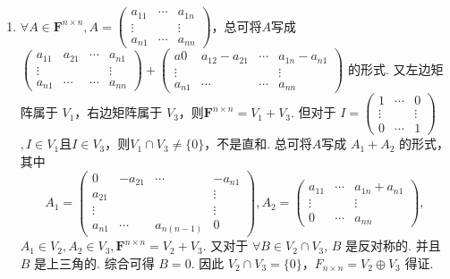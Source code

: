 \begin{enumerate}
\begin{enumerate}
              \item $\forall A\in \mathbf{F}^{n\times n},A=\begin{pmatrix}
                            a_{11} & \cdots & a_{1n} \\
                            \vdots &        & \vdots \\
                            a_{n1} & \cdots & a_{nn}
                        \end{pmatrix}$，总可将$A$写成 $\begin{pmatrix}
                            a_{11} & a_{21} & \cdots & a_{n1} \\
                            \vdots &        &        & \vdots \\
                            a_{n1} & \cdots & \cdots & a_{nn}
                        \end{pmatrix}+\begin{pmatrix}
                            a0     & a_{12}-a_{21} & \cdots & a_{1n}-a_{n1} \\
                            \vdots &               &        & \vdots        \\
                            a_{n1} & \cdots        & \cdots & a_{nn}
                        \end{pmatrix}$ 的形式. 又左边矩阵属于 $V_1$，右边矩阵属于 $V_3$，则$\mathbf{F}^{n \times n}=V_1+V_3$. 但对于 $I=\begin{pmatrix}
                            1      & \cdots & 0      \\
                            \vdots &        & \vdots \\
                            0      & \cdots & 1
                        \end{pmatrix} $ $,I \in V_1$且$I \in V_3$，则$V_1\cap V_3\ne\{0\}$，不是直和. 总可将$A$写成 $A_1+A_2$ 的形式，其中
                    \[A_1=\begin{pmatrix}
                            0      & -a_{21} & \cdots     & -a_{n1} \\
                            a_{21} &         &            & \vdots  \\
                            \vdots &         &            & \vdots  \\
                            a_{n1} & \cdots  & a_{n(n-1)} & 0
                        \end{pmatrix},A_2=\begin{pmatrix}
                            a_{11} & \cdots & a_{1n}+a_{n1} \\
                            \vdots &        & \vdots        \\
                            0      & \cdots & a_{nn}
                        \end{pmatrix},\]
                    $A_1\in V_2,A_2\in V_3,\mathbf{F}^{n\times n}=V_2+V_3$. 又对于 $\forall B\in V_2\cap V_3$, $B$ 是反对称的. 并且 $B$ 是上三角的. 综合可得  $B=0$. 因此 $V_2\cap V_3=\{0\}$，$F_{n\times n}=V_2\oplus V_3$ 得证.
          \end{enumerate}


\end{enumerate}
